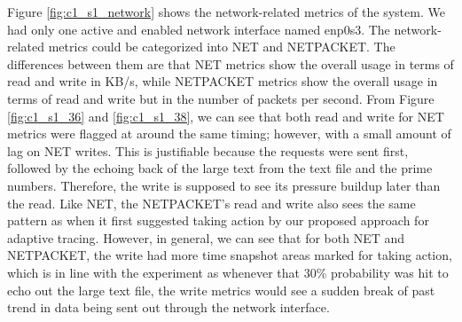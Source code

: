 \documentclass[pdflatex,sn-nature]{sn-jnl}%
\theoremstyle{thmstyleone}%
\theoremstyle{thmstyletwo}%
\theoremstyle{thmstylethree}%
\begin{document}
Figure \ref{fig:c1_s1_network} shows the network-related metrics of the system. We had only one active and enabled network interface named enp0s3. The network-related metrics could be categorized into NET and NETPACKET. The differences between them are that NET metrics show the overall usage in terms of read and write in KB/s, while NETPACKET metrics show the overall usage in terms of read and write but in the number of packets per second. From Figure \ref{fig:c1_s1_36} and \ref{fig:c1_s1_38}, we can see that both read and write for NET metrics were flagged at around the same timing; however, with a small amount of lag on NET writes. This is justifiable because the requests were sent first, followed by the echoing back of the large text from the text file and the prime numbers. Therefore, the write is supposed to see its pressure buildup later than the read. Like NET, the NETPACKET's read and write also sees the same pattern as when it first suggested taking action by our proposed approach for adaptive tracing. However, in general, we can see that for both NET and NETPACKET, the write had more time snapshot areas marked for taking action, which is in line with the experiment as whenever that 30\% probability was hit to echo out the large text file, the write metrics would see a sudden break of past trend in data being sent out through the network interface.
\end{document}
